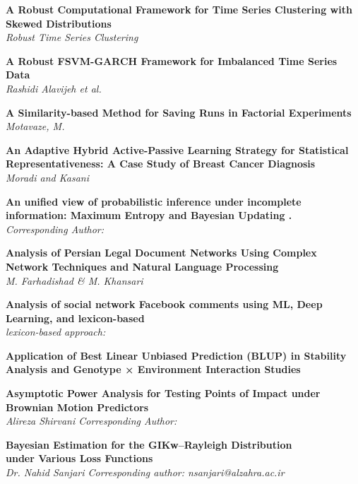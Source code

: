 \noindent
{\bf
A Robust Computational Framework for Time Series Clustering with Skewed Distributions
}\dotfill \pageref{p.1176}\\
{\small \it
Robust Time Series Clustering
}


\noindent
{\bf
A Robust FSVM-GARCH Framework for Imbalanced Time Series Data
}\dotfill \pageref{p.1014}\\
{\small \it
Rashidi Alavijeh et al.
}


\noindent
{\bf
A Similarity-based Method for Saving Runs in Factorial Experiments
}\dotfill \pageref{p.1276}\\
{\small \it
Motavaze, M.
}


\noindent
{\bf
An Adaptive Hybrid Active-Passive Learning Strategy for Statistical Representativeness: A Case Study of Breast Cancer Diagnosis
}\dotfill \pageref{p.1346}\\
{\small \it
Moradi and Kasani
}


\noindent
{\bf
An unified view of probabilistic inference under incomplete information: Maximum Entropy and Bayesian Updating .
}\dotfill \pageref{p.1333}\\
{\small \it
Corresponding Author:
}


\noindent
{\bf
Analysis of Persian Legal Document Networks Using Complex Network Techniques and Natural Language Processing
}\dotfill \pageref{p.1317}\\
{\small \it
M. Farhadishad \& M. Khansari
}


\noindent
{\bf
Analysis of social network Facebook comments using ML, Deep Learning, and lexicon-based
}\dotfill \pageref{p.1191}\\
{\small \it
lexicon-based approach:
}


\noindent
{\bf
Application of Best Linear Unbiased Prediction (BLUP) in Stability Analysis and Genotype × Environment Interaction Studies
}\dotfill \pageref{p.1096}\\
{\small \it

}


\noindent
{\bf
Asymptotic Power Analysis for Testing Points of Impact under Brownian Motion Predictors
}\dotfill \pageref{p.1198}\\
{\small \it
Alireza Shirvani Corresponding Author:
}


\noindent
{\bf
Bayesian Estimation for the GIKw--Rayleigh Distribution\\ under Various Loss Functions
}\dotfill \pageref{p.1046}\\
{\small \it
Dr. Nahid Sanjari Corresponding author: nsanjari@alzahra.ac.ir
}


